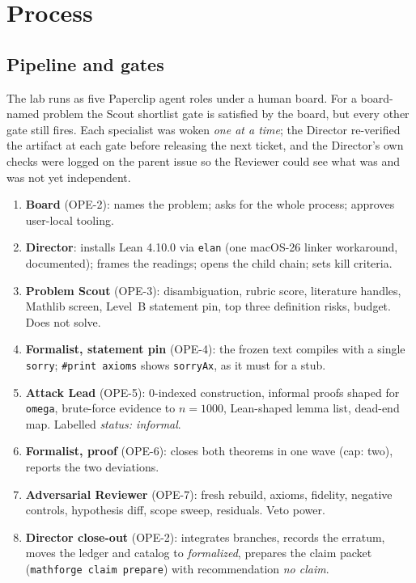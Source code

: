 \documentclass[11pt,a4paper]{article}
\theoremstyle{definition}
\theoremstyle{remark}
\newcommand{\lean}[1]{\texttt{#1}}
\begin{document}
\section{Process}
\label{sec:process}

\subsection{Pipeline and gates}

The lab runs as five Paperclip agent roles under a human board. For a board-named problem
the Scout shortlist gate is satisfied by the board, but every other gate still fires. Each
specialist was woken \emph{one at a time}; the Director re-verified the artifact at each gate
before releasing the next ticket, and the Director's own checks were logged on the parent
issue so the Reviewer could see what was and was not yet independent.

\begin{enumerate}[nosep]
\item \textbf{Board} (OPE-2): names the problem; asks for the whole process; approves
user-local tooling.
\item \textbf{Director}: installs Lean 4.10.0 via \lean{elan} (one macOS-26 linker
workaround, documented); frames the readings; opens the child chain; sets kill criteria.
\item \textbf{Problem Scout} (OPE-3): disambiguation, rubric score, literature handles,
Mathlib screen, Level~B statement pin, top three definition risks, budget. Does not solve.
\item \textbf{Formalist, statement pin} (OPE-4): the frozen text compiles with a single
\lean{sorry}; \lean{\#print axioms} shows \lean{sorryAx}, as it must for a stub.
\item \textbf{Attack Lead} (OPE-5): 0-indexed construction, informal proofs shaped for
\lean{omega}, brute-force evidence to $n=1000$, Lean-shaped lemma list, dead-end map.
Labelled \emph{status: informal}.
\item \textbf{Formalist, proof} (OPE-6): closes both theorems in one wave (cap: two), reports
the two deviations.
\item \textbf{Adversarial Reviewer} (OPE-7): fresh rebuild, axioms, fidelity, negative
controls, hypothesis diff, scope sweep, residuals. Veto power.
\item \textbf{Director close-out} (OPE-2): integrates branches, records the erratum, moves
the ledger and catalog to \emph{formalized}, prepares the claim packet
(\texttt{mathforge claim prepare}) with recommendation \emph{no claim}.
\end{enumerate}
\end{document}
